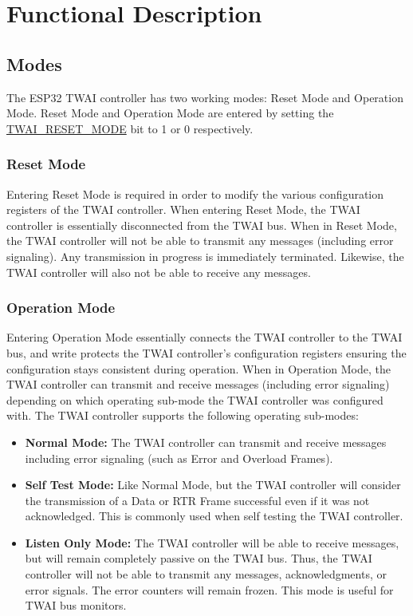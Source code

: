 \documentclass[main\_\_EN.tex]{subfiles}
\begin{document}
\section{Functional Description}

\subsection{Modes}
\label{subsubsec:modes}
The ESP32 TWAI controller has two working modes: Reset Mode and Operation Mode. Reset Mode and Operation Mode are entered by setting the \hyperref[fielddesc:TWAIRESETMODE]{TWAI\_RESET\_MODE} bit to 1 or 0 respectively.

\subsubsection{Reset Mode}
Entering Reset Mode is required in order to modify the various configuration registers of the TWAI controller. When entering Reset Mode, the TWAI controller is essentially disconnected from the TWAI bus. When in Reset Mode, the TWAI controller will not be able to transmit any messages (including error signaling). Any transmission in progress is immediately terminated. Likewise, the TWAI controller will also not be able to receive any messages.

\subsubsection{Operation Mode}
Entering Operation Mode essentially connects the TWAI controller to the TWAI bus, and write protects the TWAI controller’s configuration registers ensuring the configuration stays consistent during operation. When in Operation Mode, the TWAI controller can transmit and receive messages (including error signaling) depending on which operating sub-mode the TWAI controller was configured with. The TWAI controller supports the following operating sub-modes:

\begin{itemize}
    \item {\bfseries Normal Mode:} The TWAI controller can transmit and receive messages including error signaling (such as Error and Overload Frames).
    \item {\bfseries Self Test Mode:} Like Normal Mode, but the TWAI controller will consider the transmission of a Data or RTR Frame successful even if it was not acknowledged. This is commonly used when self testing the TWAI controller.
    \item {\bfseries Listen Only Mode:} The TWAI controller will be able to receive messages, but will remain completely passive on the TWAI bus. Thus, the TWAI controller will not be able to transmit any messages, acknowledgments, or error signals. The error counters will remain frozen. This mode is useful for TWAI bus monitors.
\end{itemize}
\end{document}
